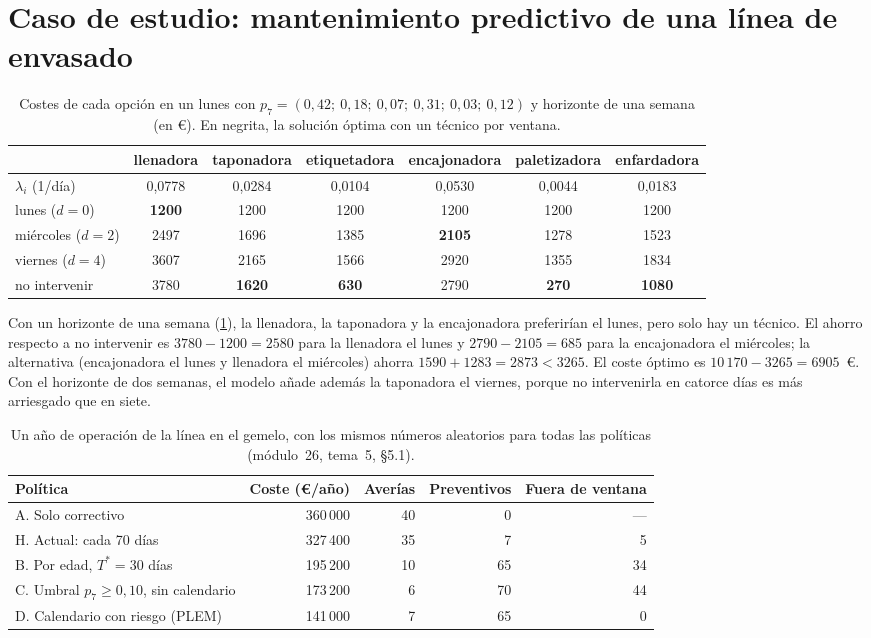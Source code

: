 \section{Caso de estudio: mantenimiento predictivo de una línea de envasado}

\addtocounter{definicion}{1}%

\begin{table}[h]
\centering\small
\caption{Costes de cada opción en un lunes con $p_7=(0{,}42;\ 0{,}18;\ 0{,}07;\ 0{,}31;\ 0{,}03;\ 0{,}12)$ y horizonte de una semana (en €). En negrita, la solución óptima con un técnico por ventana.}\label{tab:plan}
\setlength{\tabcolsep}{4pt}\footnotesize
\begin{tabular}{@{}lcccccc@{}}
\toprule
 & llenadora & taponadora & etiquetadora & encajonadora & paletizadora & enfardadora \\
\midrule
$\lambda_i$ (1/día) & 0{,}0778 & 0{,}0284 & 0{,}0104 & 0{,}0530 & 0{,}0044 & 0{,}0183 \\
lunes ($d=0$) & \textbf{1200} & 1200 & 1200 & 1200 & 1200 & 1200 \\
miércoles ($d=2$) & 2497 & 1696 & 1385 & \textbf{2105} & 1278 & 1523 \\
viernes ($d=4$) & 3607 & 2165 & 1566 & 2920 & 1355 & 1834 \\
no intervenir & 3780 & \textbf{1620} & \textbf{630} & 2790 & \textbf{270} & \textbf{1080} \\
\bottomrule
\end{tabular}
\end{table}

Con un horizonte de una semana (\cref{tab:plan}), la llenadora, la taponadora y la encajonadora preferirían el lunes, pero solo hay un técnico. El ahorro respecto a no intervenir es $3780-1200=2580$ para la llenadora el lunes y $2790-2105=685$ para la encajonadora el miércoles; la alternativa (encajonadora el lunes y llenadora el miércoles) ahorra $1590+1283=2873<3265$. El coste óptimo es $10\,170-3265=6905$~€. Con el horizonte de dos semanas, el modelo añade además la taponadora el viernes, porque no intervenirla en catorce días es más arriesgado que en siete.

\begin{table}[h]
\centering\small
\caption{Un año de operación de la línea en el gemelo, con los mismos números aleatorios para todas las políticas (módulo~26, tema~5, §5.1).}\label{tab:politicas}
\setlength{\tabcolsep}{5pt}
\begin{tabular}{@{}lrrrr@{}}
\toprule
Política & Coste (€/año) & Averías & Preventivos & Fuera de ventana \\
\midrule
A. Solo correctivo & 360\,000 & 40 & 0 & --- \\
H. Actual: cada 70 días & 327\,400 & 35 & 7 & 5 \\
B. Por edad, $T^{*}=30$ días & 195\,200 & 10 & 65 & 34 \\
C. Umbral $p_7\ge0{,}10$, sin calendario & 173\,200 & 6 & 70 & 44 \\
D. Calendario con riesgo (PLEM) & 141\,000 & 7 & 65 & 0 \\
\bottomrule
\end{tabular}
\end{table}

